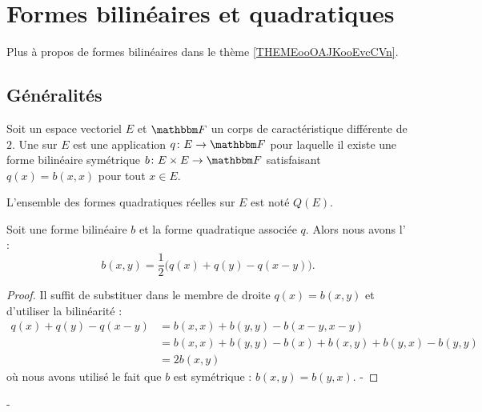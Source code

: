 

\section{Formes bilinéaires et quadratiques}

Plus à propos de formes bilinéaires dans le thème \ref{THEMEooOAJKooEvcCVn}.

\subsection{Généralités}

\begin{definition}   \label{DefBSIoouvuKR}
    Soit un espace vectoriel \( E\) et \( \eF\) un corps de caractéristique différente de \( 2\). Une  sur \( E\) est une application \( q\colon E\to \eF\) pour laquelle il existe une forme bilinéaire symétrique \( b\colon E\times E\to \eF\) satisfaisant \( q(x)=b(x,x)\) pour tout \( x\in E\).

    L'ensemble des formes quadratiques réelles sur \( E\) est noté \( Q(E)\).
\end{definition}

\begin{proposition} \label{PROPooZLXVooOsXCcB}
    Soit une forme bilinéaire \( b\) et la forme quadratique associée \( q\). Alors nous avons l' :
\begin{equation}    \label{EqMrbsop}
    b(x,y)=\frac{ 1 }{2}\big( q(x)+q(y)-q(x-y) \big).
\end{equation}
\end{proposition}

\begin{proof}
    Il suffit de substituer dans le membre de droite \( q(x)=b(x,y)\) et d'utiliser la bilinéarité :
    \begin{subequations}
        \begin{align}
            q(x)+q(y)-q(x-y)&=b(x,x)+b(y,y)-b(x-y,x-y)\\
            &=b(x,x)+b(y,y)-b(x)+b(x,y)+b(y,x)-b(y,y)\\
            &=2b(x,y)
        \end{align}
    \end{subequations}
    où nous avons utilisé le fait que \( b\) est symétrique : \( b(x,y)=b(y,x)\).
- \end{proof}
- 

